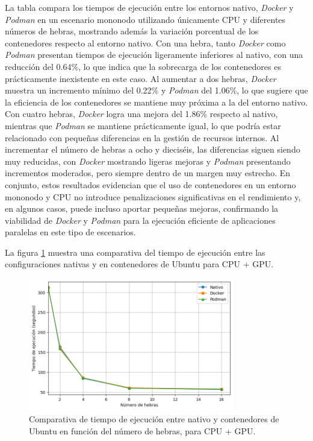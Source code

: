 La tabla compara los tiempos de ejecución entre los entornos nativo, \textit{Docker} y \textit{Podman} en un escenario mononodo utilizando únicamente CPU y diferentes números de hebras, mostrando además la variación porcentual de los contenedores respecto al entorno nativo. Con una hebra, tanto \textit{Docker} como \textit{Podman} presentan tiempos de ejecución ligeramente inferiores al nativo, con una reducción del 0.64\%, lo que indica que la sobrecarga de los contenedores es prácticamente inexistente en este caso. Al aumentar a dos hebras, \textit{Docker} muestra un incremento mínimo del 0.22\% y \textit{Podman} del 1.06\%, lo que sugiere que la eficiencia de los contenedores se mantiene muy próxima a la del entorno nativo. Con cuatro hebras, \textit{Docker} logra una mejora del 1.86\% respecto al nativo, mientras que \textit{Podman} se mantiene prácticamente igual, lo que podría estar relacionado con pequeñas diferencias en la gestión de recursos internos. Al incrementar el número de hebras a ocho y dieciséis, las diferencias siguen siendo muy reducidas, con \textit{Docker} mostrando ligeras mejoras y \textit{Podman} presentando incrementos moderados, pero siempre dentro de un margen muy estrecho. En conjunto, estos resultados evidencian que el uso de contenedores en un entorno mononodo y CPU no introduce penalizaciones significativas en el rendimiento y, en algunos casos, puede incluso aportar pequeñas mejoras, confirmando la viabilidad de \textit{Docker} y \textit{Podman} para la ejecución eficiente de aplicaciones paralelas en este tipo de escenarios.

La figura \ref{fig:single-node_ubuntu_container_vs_native_gpu_time} muestra una comparativa del tiempo de ejecución entre las configuraciones nativas y en contenedores de Ubuntu para CPU + GPU.

\begin{figure}[H]
    \centering
    \includegraphics[width=0.8\textwidth]{imagenes/cap5/single-node_ubuntu_container_vs_native_gpu_time.png}
    \caption{Comparativa de tiempo de ejecución entre nativo y contenedores de Ubuntu en función del número de hebras, para CPU + GPU.}
    \label{fig:single-node_ubuntu_container_vs_native_gpu_time}
\end{figure}

